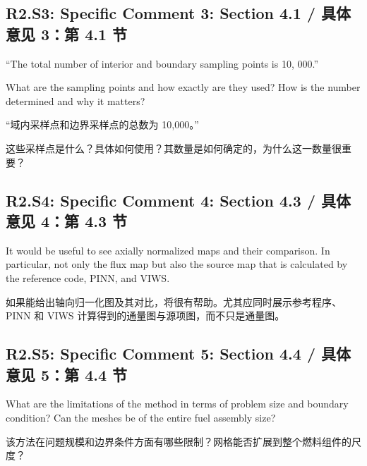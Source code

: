 \documentclass[11pt,a4paper,twoside]{article}
\begin{document}
\subsection{R2.S3: Specific Comment 3: Section 4.1 / 具体意见 3：第 4.1 节}
\begin{englishcomment}
``The total number of interior and boundary sampling points is 10, 000.''

What are the sampling points and how exactly are they used? How is the number determined and why it matters?
\end{englishcomment}
\begin{chinesecomment}
“域内采样点和边界采样点的总数为 10,000。”

这些采样点是什么？具体如何使用？其数量是如何确定的，为什么这一数量很重要？
\end{chinesecomment}
\begin{revisionidea}
\end{revisionidea}

\subsection{R2.S4: Specific Comment 4: Section 4.3 / 具体意见 4：第 4.3 节}
\begin{englishcomment}
It would be useful to see axially normalized maps and their comparison. In particular, not only the flux map but also the source map that is calculated by the reference code, PINN, and VIWS.
\end{englishcomment}
\begin{chinesecomment}
如果能给出轴向归一化图及其对比，将很有帮助。尤其应同时展示参考程序、PINN 和 VIWS 计算得到的通量图与源项图，而不只是通量图。
\end{chinesecomment}
\begin{revisionidea}
\end{revisionidea}

\subsection{R2.S5: Specific Comment 5: Section 4.4 / 具体意见 5：第 4.4 节}
\begin{englishcomment}
What are the limitations of the method in terms of problem size and boundary condition? Can the meshes be of the entire fuel assembly size?
\end{englishcomment}
\begin{chinesecomment}
该方法在问题规模和边界条件方面有哪些限制？网格能否扩展到整个燃料组件的尺度？
\end{chinesecomment}
\begin{revisionidea}
\end{revisionidea}
\end{document}
